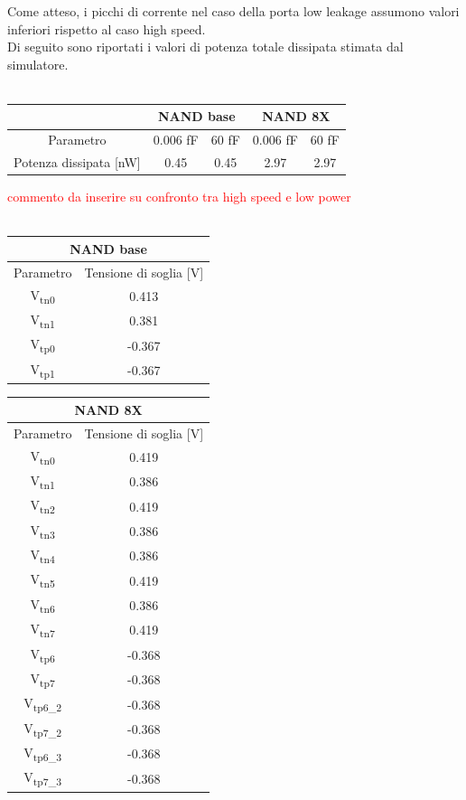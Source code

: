 \documentclass[11pt,  english, makeidx, a4paper, titlepage, oneside]{book}
\begin{document}
Come atteso, i picchi di corrente nel caso della porta low leakage assumono valori inferiori rispetto al caso high speed.
\\
Di seguito sono riportati i valori di potenza totale dissipata stimata dal simulatore.
\\\\
\begin{center}
	\begin{tabular}{|c|c|c||c|c|}
	\hline
	& \multicolumn{2}{|c||}{NAND base} & \multicolumn{2}{|c|}{NAND 8X}\\
	\hline
	Parametro & 0.006 fF & 60 fF & 0.006 fF & 60 fF \\
	\hline
	Potenza dissipata [nW] & 0.45 & 0.45 & 2.97 & 2.97\\
	\hline
	\end{tabular}	
\end{center}
\vspace{0.3cm}
\textcolor{red}{commento da inserire su confronto tra high speed e low power}
\\\\
\begin{center}
	\begin{tabular}{|c|c|}
	\hline
	 \multicolumn{2}{c}{NAND base} \\
	\hline
	Parametro & Tensione di soglia [V] \\
	\hline
	 V\textsubscript{tn0} & 0.413\\
	\hline
	 V\textsubscript{tn1} & 0.381 \\
	\hline
	V\textsubscript{tp0} & -0.367 \\
	\hline
	V\textsubscript{tp1} & -0.367 \\
	\hline
	\end{tabular}	
	\begin{tabular}{|c|c|}
	\hline
	 \multicolumn{2}{c}{NAND 8X} \\
	\hline
	Parametro & Tensione di soglia [V] \\
	\hline
	 V\textsubscript{tn0} & 0.419\\
	\hline
	 V\textsubscript{tn1} & 0.386 \\
	 \hline
	 V\textsubscript{tn2} & 0.419 \\
	 \hline
	 V\textsubscript{tn3} & 0.386 \\
	 \hline
	 V\textsubscript{tn4} & 0.386 \\
	 \hline
	 V\textsubscript{tn5} & 0.419 \\
	 \hline
	 V\textsubscript{tn6} & 0.386 \\
	\hline
	 V\textsubscript{tn7} & 0.419 \\
	 \hline
	V\textsubscript{tp6} & -0.368 \\
	\hline
	V\textsubscript{tp7} & -0.368 \\
	\hline
	V\textsubscript{tp6\_2} & -0.368 \\
	\hline
	V\textsubscript{tp7\_2} & -0.368 \\
	\hline
	V\textsubscript{tp6\_3} & -0.368 \\
	\hline
	V\textsubscript{tp7\_3} & -0.368 \\
	\hline
	\end{tabular}	
\end{center}
\end{document}
